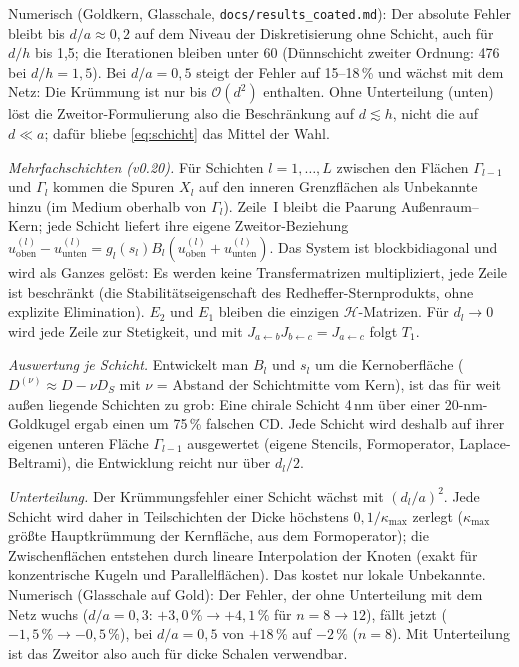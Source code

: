 \documentclass[11pt, a4paper]{article}
\theoremstyle{plain}
\theoremstyle{definition}
\begin{document}
Numerisch (Goldkern, Glasschale, \texttt{docs/results\_coated.md}): Der absolute Fehler bleibt bis $d/a\approx0{,}2$ auf dem
Niveau der Diskretisierung ohne Schicht, auch für $d/h$ bis 1,5; die Iterationen bleiben unter 60 (Dünnschicht zweiter
Ordnung: 476 bei $d/h=1{,}5$). Bei $d/a=0{,}5$ steigt der Fehler auf 15--18\,\% und wächst mit dem Netz: Die Krümmung ist nur bis
$\mathcal{O}(d^2)$ enthalten. Ohne Unterteilung (unten) löst die Zweitor-Formulierung also die Beschränkung auf $d\lesssim h$, nicht die auf
$d\ll a$; dafür bliebe \eqref{eq:schicht} das Mittel der Wahl.

\emph{Mehrfachschichten (v0.20).} Für Schichten $l=1,\dots,L$ zwischen den Flächen $\Gamma_{l-1}$ und $\Gamma_l$ kommen die
Spuren $X_l$ auf den inneren Grenzflächen als Unbekannte hinzu (im Medium oberhalb von $\Gamma_l$). Zeile~I bleibt die Paarung
Außenraum--Kern; jede Schicht liefert ihre eigene Zweitor-Beziehung
$u^{(l)}_{\mathrm{oben}}-u^{(l)}_{\mathrm{unten}}=g_l(s_l)B_l(u^{(l)}_{\mathrm{oben}}+u^{(l)}_{\mathrm{unten}})$. Das System ist
blockbidiagonal und wird als Ganzes gelöst: Es werden keine Transfermatrizen multipliziert, jede Zeile ist beschränkt (die
Stabilitätseigenschaft des Redheffer-Sternprodukts, ohne explizite Elimination). $E_2$ und $E_1$ bleiben die einzigen
$\mathcal{H}$-Matrizen. Für $d_l\to0$ wird jede Zeile zur Stetigkeit, und mit $J_{a\leftarrow b}J_{b\leftarrow c}=J_{a\leftarrow c}$
folgt $T_1$.

\emph{Auswertung je Schicht.} Entwickelt man $B_l$ und $s_l$ um die Kernoberfläche ($D^{(\nu)}\approx D-\nu D_S$ mit $\nu$ = Abstand
der Schichtmitte vom Kern), ist das für weit außen liegende Schichten zu grob: Eine chirale Schicht 4\,nm über einer
20-nm-Goldkugel ergab einen um 75\,\% falschen CD. Jede Schicht wird deshalb auf ihrer eigenen unteren Fläche
$\Gamma_{l-1}$ ausgewertet (eigene Stencils, Formoperator, Laplace-Beltrami), die Entwicklung reicht nur über $d_l/2$.

\emph{Unterteilung.} Der Krümmungsfehler einer Schicht wächst mit $(d_l/a)^2$. Jede Schicht wird daher in Teilschichten der
Dicke höchstens $0{,}1/\kappa_{\max}$ zerlegt ($\kappa_{\max}$ größte Hauptkrümmung der Kernfläche, aus dem Formoperator); die
Zwischenflächen entstehen durch lineare Interpolation der Knoten (exakt für konzentrische Kugeln und Parallelflächen). Das kostet
nur lokale Unbekannte. Numerisch (Glasschale auf Gold): Der Fehler, der ohne Unterteilung mit dem Netz wuchs
($d/a=0{,}3$: $+3{,}0\,\%\to+4{,}1\,\%$ für $n=8\to12$), fällt jetzt ($-1{,}5\,\%\to-0{,}5\,\%$), bei $d/a=0{,}5$ von $+18\,\%$
auf $-2\,\%$ ($n=8$). Mit Unterteilung ist das Zweitor also auch für dicke Schalen verwendbar.
\end{document}
